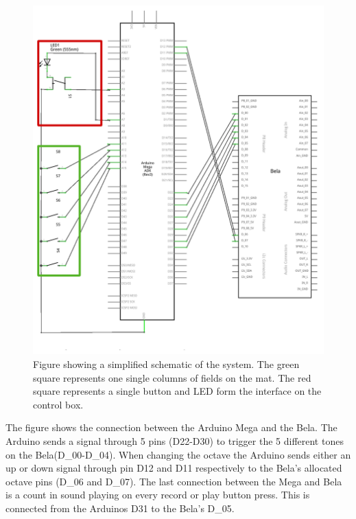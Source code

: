 	\begin{figure}[H]
	\centering
	\includegraphics[width=1\linewidth]{figure/Implementation/project_schem_marked.png}
	\caption{Figure showing a simplified schematic of the system. The green square represents one single columns of fields on the mat. The red square represents a single button and LED form the interface on the control box.}
	\label{fig:schematic}
\end{figure}

The figure shows the connection between the Arduino Mega and the Bela. The Arduino sends a signal through 5 pins (D22-D30) to trigger the 5 different tones on the Bela(D\_00-D\_04). When changing the octave the Arduino sends either an up or down signal through pin D12 and D11 respectively to the Bela's allocated octave pins (D\_06 and D\_07). The last connection between the Mega and Bela is a count in sound playing on every record or play button press. This is connected from the Arduinos D31 to the Bela's D\_05.